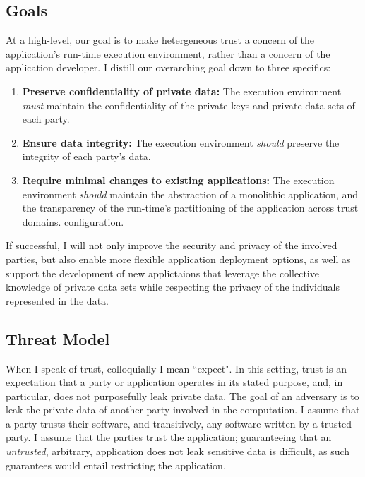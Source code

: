 

\subsection{Goals}
At a high-level, our goal is to make hetergeneous trust a concern
of the application's run-time execution environment, rather than a concern of
the application developer.
%
I distill our overarching goal down to three specifics:

\begin{enumerate}
\item \textbf{Preserve confidentiality of private data:} The execution
environment \emph{must} maintain the confidentiality of the private keys and
private data sets of each party.
\item \textbf{Ensure data integrity:} The execution environment \emph{should}
    preserve the integrity of each party's data.
\item \textbf{Require minimal changes to existing applications:}
    The execution environment \emph{should} maintain the abstraction of a monolithic
application, and the transparency of the run-time's partitioning of the
application across trust domains.
%
configuration.
\end{enumerate}

If successful, I will not only improve the security and privacy of the
involved parties, but also enable more flexible application deployment options,
as well as support the development of new applictaions that leverage the
collective knowledge of private data sets while respecting the privacy of the
individuals represented in the data.

\subsection{Threat Model}

When I speak of trust, colloquially I  mean ``expect". 
%
In this setting, trust is an expectation that a party or application operates in
its stated purpose, and, in particular, does not purposefully leak private
data.
%
The goal of an adversary is to leak the private data of another party involved
in the computation.
%
I assume that a party trusts their software, and transitively, any software
written by a trusted party.
%
I assume that the parties trust the application; guaranteeing that an
\emph{untrusted}, arbitrary, application does not leak sensitive data is
difficult, as such guarantees would entail restricting the application.


